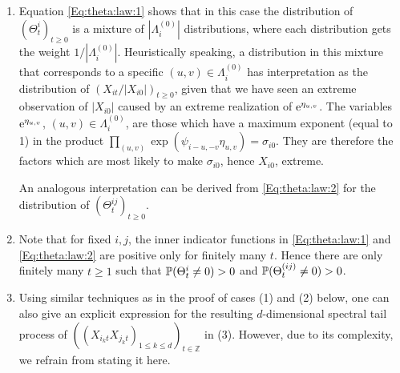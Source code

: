 \bre\label{rem:77} \begin{enumerate}
      \item Equation \eqref{Eq:theta:law:1} shows that in this case the distribution 
of $(\Theta^{i}_t)_{t \geq 0}$ is a mixture of $|\Lambda_i^{(0)}|$ distributions, where 
each distribution gets the weight $1/|\Lambda_i^{(0)}|$. 
Heuristically speaking, a distribution in this mixture that corresponds 
to a specific $(u,v) \in \Lambda_i^{(0)}$ has interpretation as the distribution of $(X_{it}/|X_{i0}|)_{t \geq 0}$, given that we have seen an extreme observation of $|X_{i0}|$ caused by an extreme realization of $\ex^{\eta_{u,v}}$.
The variables $\ex^{\eta_{u,v}}$, $(u,v) \in \Lambda_i^{(0)}$, are those which have a maximum exponent (equal to 1) 
in the product $\prod_{(u,v)}\exp(\psi_{i-u,-v}\eta_{u,v})=\sigma_{i0}$. They are therefore the factors which are most likely 
to make $\sigma_{i0}$, hence $X_{i0}$, extreme. 
\par      
An analogous interpretation can be derived from \eqref{Eq:theta:law:2} for the distribution of $(\Theta^{ij}_t)_{t \geq 0}$. 
      \item Note that for fixed $i, j$, the inner indicator functions in \eqref{Eq:theta:law:1} and \eqref{Eq:theta:law:2} 
are positive only for finitely many $t$. Hence there are only finitely many $t\geq 1$ such that 
$\P(\Theta_t^{i}\neq 0)>0$ and $\P(\Theta_t^{(ij)}\neq 0)>0$.
      \item Using similar techniques as in the proof of cases (1) and (2) below, one can
also give an explicit expression for the resulting $d$-dimensional spectral tail process 
of $((X_{i_kt}X_{j_kt})_{1\leq k \leq d})_{t \in \mathbb{Z}}$ in (3). 
However, due to its complexity, we refrain from stating it here.
     \end{enumerate}
\ere
